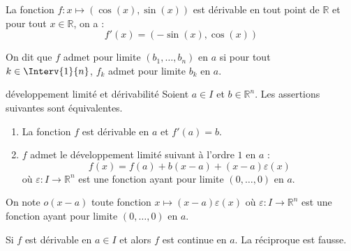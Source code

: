 \documentclass[a4paper,10pt]{report}
\begin{document}

\begin{Exemple} La fonction $f : x \mapsto (\cos(x), \sin(x))$ est dérivable en tout point de $\mathbb{R}$ et pour tout $x \in \mathbb{R}$, on a :
$$ f'(x) = (- \sin(x), \cos(x))$$
\end{Exemple}

\begin{Remarque}{} On dit que $f$ admet pour limite $(b_1, \ldots, b_n)$ en $a$ si pour tout $k \in \Interv{1}{n}$, $f_k$ admet pour limite $b_k$ en $a$.
\end{Remarque}

\begin{Proposition}{développement limité et dérivabilité} Soient $a \in I$ et $b \in \mathbb{R}^n$. Les assertions suivantes sont équivalentes.

\begin{enumerate}
\item La fonction $f$ est dérivable en $a$ et $f'(a)=b$.
\item $f$ admet le développement limité suivant à l'ordre $1$ en $a$ :
$$ f(x) = f(a)+ b(x-a) + (x-a) \varepsilon(x)$$
où $\varepsilon : I \rightarrow \mathbb{R}^n$ est une fonction ayant pour limite $(0, \ldots, 0)$ en $a$.
\end{enumerate}
\end{Proposition}

\begin{Remarque}{} On note $o(x-a)$ toute fonction $x \mapsto (x-a)\varepsilon(x)$ où $\varepsilon : I \rightarrow \mathbb{R}^n$ est une fonction ayant pour limite $(0, \ldots, 0)$ en $a$.
\end{Remarque}

\begin{Corollaire}{} Si $f$ est dérivable en $a \in I$ et alors $f$ est continue en $a$. La réciproque est fausse.
\end{Corollaire}

\end{document}
